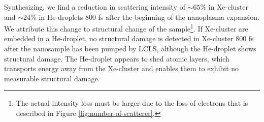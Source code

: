 Synthesizing, we find a reduction in scattering intensity of $\sim 65 \%$ in Xe-cluster and $\sim 24 \%$ in He-droplets 800 fs after the beginning of the nanoplasma expansion. We attribute this change to structural change of the sample\footnote{The actual intensity loss must be larger due to the loss of electrons that is described in Figure \ref{fig:number-of-scatterer}.}. If Xe-cluster are embedded in a He-droplet, no structural damage is detected in Xe-cluster 800 fs after the nanosample has been pumped by LCLS, although the He-droplet shows structural damage. The He-droplet appears to shed atomic layers, which transports energy away from the Xe-cluster and enables them to exhibit no measurable structural damage.
%
%
%
%
%
%
%
%
%
%
%
%
%
%
%

